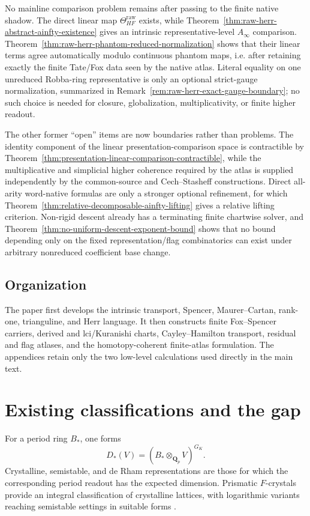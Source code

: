 \documentclass[11pt]{article}
\theoremstyle{definition}
\newcommand{\Qp}{\mathbf Q_p}
\newcommand{\GK}{G_K}
\begin{document}
No mainline comparison problem remains after passing to the finite native shadow.  The direct linear map $\Theta_{HF}^{\mathrm{raw}}$ exists, while Theorem~\ref{thm:raw-herr-abstract-ainfty-existence} gives an intrinsic representative-level $A_\infty$ comparison.  Theorem~\ref{thm:raw-herr-phantom-reduced-normalization} shows that their linear terms agree automatically modulo continuous phantom maps, i.e. after retaining exactly the finite Tate/Fox data seen by the native atlas.  Literal equality on one unreduced Robba-ring representative is only an optional strict-gauge normalization, summarized in Remark~\ref{rem:raw-herr-exact-gauge-boundary}; no such choice is needed for closure, globalization, multiplicativity, or finite higher readout.

The other former ``open'' items are now boundaries rather than problems.  The identity component of the linear presentation-comparison space is contractible by Theorem~\ref{thm:presentation-linear-comparison-contractible}, while the multiplicative and simplicial higher coherence required by the atlas is supplied independently by the common-source and Cech--Stasheff constructions.  Direct all-arity word-native formulas are only a stronger optional refinement, for which Theorem~\ref{thm:relative-decomposable-ainfty-lifting} gives a relative lifting criterion.  Non-rigid descent already has a terminating finite chartwise solver, and Theorem~\ref{thm:no-uniform-descent-exponent-bound} shows that no bound depending only on the fixed representation/flag combinatorics can exist under arbitrary nonreduced coefficient base change.

\subsection{Organization}

The paper first develops the intrinsic transport, Spencer, Maurer--Cartan, rank-one, trianguline, and Herr language.  It then constructs finite Fox--Spencer carriers, derived and lci/Kuranishi charts, Cayley--Hamilton transport, residual and flag atlases, and the homotopy-coherent finite-atlas formulation.  The appendices retain only the two low-level calculations used directly in the main text.


\section{Existing classifications and the gap}

For a period ring $B_*$, one forms
\[
D_*(V)=(B_*\otimes_{\Qp}V)^{\GK}.
\]
Crystalline, semistable, and de Rham representations are those for which the corresponding period readout has the expected dimension.  Prismatic $F$-crystals provide an integral classification of crystalline lattices, with logarithmic variants reaching semistable settings in suitable forms \cite{BhattScholzePFC,DuLiuPrismatic}.
\end{document}

